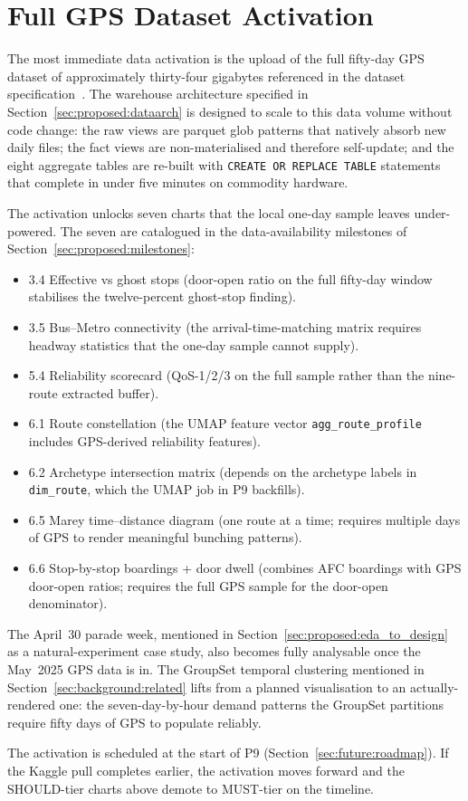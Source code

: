\section{Full GPS Dataset Activation}
\label{sec:future:gps}

The most immediate data activation is the upload of the full
fifty-day GPS dataset of approximately thirty-four gigabytes
referenced in the dataset
specification~\cite{hcmcgps2025}. The warehouse architecture
specified in Section~\ref{sec:proposed:dataarch} is designed
to scale to this data volume without code change: the raw views
are parquet glob patterns that natively absorb new daily files;
the fact views are non-materialised and therefore self-update;
and the eight aggregate tables are re-built with
\texttt{CREATE OR REPLACE TABLE} statements that complete in
under five minutes on commodity hardware.

The activation unlocks seven charts that the local one-day
sample leaves under-powered. The seven are catalogued in the
data-availability milestones of
Section~\ref{sec:proposed:milestones}:

\begin{itemize}
\item 3.4 Effective vs ghost stops (door-open ratio on the full
    fifty-day window stabilises the twelve-percent ghost-stop
    finding).
\item 3.5 Bus--Metro connectivity (the arrival-time-matching
    matrix requires headway statistics that the one-day sample
    cannot supply).
\item 5.4 Reliability scorecard (QoS-1/2/3 on the full sample
    rather than the nine-route extracted buffer).
\item 6.1 Route constellation (the UMAP feature vector
    \texttt{agg\_route\_profile} includes GPS-derived
    reliability features).
\item 6.2 Archetype intersection matrix (depends on the
    archetype labels in \texttt{dim\_route}, which the UMAP
    job in P9 backfills).
\item 6.5 Marey time--distance diagram (one route at a time;
    requires multiple days of GPS to render meaningful
    bunching patterns).
\item 6.6 Stop-by-stop boardings + door dwell (combines AFC
    boardings with GPS door-open ratios; requires the full GPS
    sample for the door-open denominator).
\end{itemize}

The April~30 parade week, mentioned in
Section~\ref{sec:proposed:eda_to_design} as a natural-experiment
case study, also becomes fully analysable once the May~2025
GPS data is in. The GroupSet temporal clustering mentioned in
Section~\ref{sec:background:related} lifts from a planned
visualisation to an actually-rendered one: the seven-day-by-hour
demand patterns the GroupSet partitions require fifty days of
GPS to populate reliably.

The activation is scheduled at the start of P9
(Section~\ref{sec:future:roadmap}). If the Kaggle pull
completes earlier, the activation moves forward and the
SHOULD-tier charts above demote to MUST-tier on the timeline.
